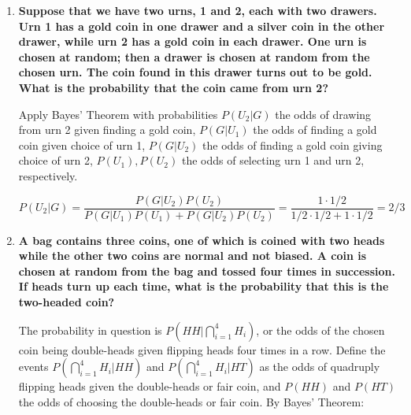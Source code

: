 \documentclass[10pt, oneside]{article}
\begin{document}
\begin{enumerate}[label=3.\arabic*]
\begin{enumerate}
	\textbf{Method 2.} By the law of total probability, $(8/20) (12/19) + (12/20) (8/19) = \boxed{48/95}$.
	
	As expected, because these are partitions of the total sample space, the probabilities sum to $33/95 + 14/95 + 48/95 = 1$.
	
	\end{enumerate}

\item  \begin{tcolorbox}[
  colback=Cerulean!5!white,
  colframe=Cerulean!75!black]
\textbf{Suppose that we have two urns, 1 and 2, each with two drawers. Urn 1 has a gold coin in one drawer and a silver coin in the other drawer, while urn 2 has a gold coin in each drawer. One urn is chosen at random; then a drawer is chosen at random from the chosen urn. The coin found in this drawer turns out to be gold. What is the probability that the coin came from urn 2?}
\end{tcolorbox}

Apply Bayes' Theorem with probabilities $P(U_2 | G)$ the odds of drawing from urn 2 given finding a gold coin, $P(G | U_1)$ the odds of finding a gold coin given choice of urn 1, $P(G | U_2)$ the odds of finding a gold coin giving choice of urn 2, $P(U_1), P(U_2)$ the odds of selecting urn 1 and urn 2, respectively.

\[ P(U_2 | G) = \frac{P(G | U_2) P(U_2)}{ P(G | U_1) P(U_1) + P(G | U_2) P(U_2)} = \frac{1 \cdot 1/2}{1/2 \cdot 1/2 + 1 \cdot 1/2} = \boxed{2/3} \]

\item  \begin{tcolorbox}[
  colback=Cerulean!5!white,
  colframe=Cerulean!75!black]
\textbf{A bag contains three coins, one of which is coined with two heads while the other two coins are normal and not biased. A coin is chosen at random from the bag and tossed four times in succession. If heads turn up each time, what is the probability that this is the two-headed coin?}
\end{tcolorbox}

The probability in question is $P(HH | \bigcap^4_{i=1} H_i)$, or the odds of the chosen coin being double-heads given flipping heads four times in a row. Define the events $P(\bigcap^4_{i=1} H_i | HH)$ and $P(\bigcap^4_{i=1} H_i | HT)$ as the odds of quadruply flipping heads given the double-heads or fair coin, and $P(HH)$ and $P(HT)$ the odds of choosing the double-heads or fair coin. By Bayes' Theorem:


\end{enumerate}
\end{document}
